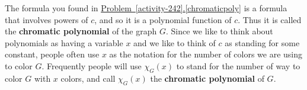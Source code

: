 \documentclass[10pt,]{book}
\newcommand{\terminology}[1]{\textbf{#1}}
\theoremstyle{plain}
\theoremstyle{definition}
\theoremstyle{definition}
\numberwithin{equation}{chapter}
\begin{document}
The formula you found in \hyperref[chromaticpoly]{Problem~\ref{activity-242}.\ref{chromaticpoly}} is a formula that involves powers of \(c\), and so it is a polynomial function of \(c\). Thus it is called the \terminology{chromatic polynomial} of the graph \(G\). Since we like to think about polynomials as having a variable \(x\) and we like to think of \(c\) as standing for some constant, people often use \(x\) as the notation for the number of colors we are using to color \(G\). Frequently people will use \(\chi_G(x)\) to stand for the number of way to color \(G\) with \(x\) colors, and call \(\chi_G(x)\) the \terminology{chromatic polynomial} of \(G\).%
\typeout{************************************************}
\typeout{************************************************}
\end{document}
